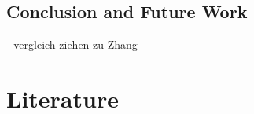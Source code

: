 \documentclass[12pt,letterpaper]{article}
\begin{document}
\subsection{Conclusion and Future Work}
- vergleich ziehen zu Zhang\\

\section{Literature}
\label{Lit}

\renewcommand{\bibsection}{}


	
\end{document}
